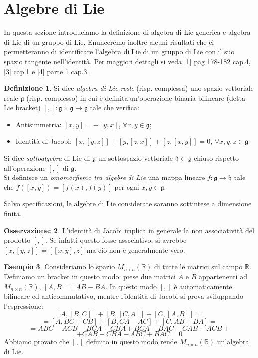 \documentclass[12pt,a4paper]{report}
\theoremstyle{definition}
\newtheorem{Def}{Definizione}[chapter]
\theoremstyle{Theorem}
\theoremstyle{definition}
\newtheorem{Ex}[Def]{Esempio}
\theoremstyle{definition}
\theoremstyle{definition}
\newtheorem{Obs}[Def]{Osservazione:}
\begin{document}
\section{Algebre di Lie}
In questa sezione introduciamo la definizione di algebra di Lie generica e algebra di Lie di un gruppo di Lie. Enunceremo inoltre alcuni risultati che ci permetteranno di identificare l'algebra di Lie di un gruppo di Lie con il suo spazio tangente nell'identità. Per maggiori dettagli si veda [1] pag 178-182 cap.4, [3] cap.1 e [4] parte 1 cap.3.
\begin{Def}
	Si dice \textit{algebra di Lie reale} (risp. complessa) uno spazio vettoriale reale $\mathfrak{g}$ (risp. complesso) in cui è definita un'operazione binaria bilineare (detta Lie bracket) $[,]:\mathfrak{g}\times\mathfrak{g}\rightarrow\mathfrak{g}$ tale che verifica:
	\begin{itemize}
		\item Antisimmetria: $[x,y]=-[y,x]$, $\forall x,y\in\mathfrak{g}$;
		\item Identità di Jacobi: $[x,[y,z]]+[y,[z,x]]+[z,[x,y]]=0$, $\forall x,y,z\in \mathfrak{g}$ 
	\end{itemize}
	Si dice \textit{sottoalgebra} di Lie di $\mathfrak{g}$ un sottospazio vettoriale $\mathfrak{h}\subset\mathfrak{g}$ chiuso rispetto all'operazione $[,]$ di $\mathfrak{g}$.\\
		Si definisce un \textit{omomorfismo tra algebre di Lie} una mappa lineare $f:\mathfrak{g}\rightarrow\mathfrak{h}$ tale che $f([x,y])=[f(x),f(y)]$ per ogni $x,y\in\mathfrak{g}$.
\end{Def}
Salvo specificazioni, le algebre di Lie considerate saranno sottintese a dimensione finita.
\begin{Obs}
	L'identità di Jacobi implica in generale la non associatività del prodotto $[,]$. Se infatti questo fosse associativo, si avrebbe $[x,[y,z]]=[[x,y],z]$ ma ciò non è generalmente vero.
\end{Obs}
\begin{Ex}
	Consideriamo lo spazio $M_{n\times n}(\mathbb{R})$ di tutte le matrici sul campo $\mathbb{R}$. Definiamo un bracket in questo modo: prese due matrici $A$ e $B$ appartenenti ad $M_{n\times n}(\mathbb{R})$, $[A,B]=AB-BA$. In questo modo $[,]$ è automaticamente bilineare ed anticommutativo, mentre l'identità di Jacobi si prova sviluppando l'espressione:
	$$[A,[B,C]]+[B,[C,A]]+[C,[A,B]]=$$
	$$=[A,BC-CB]+[B,CA-AC]+[C,AB-BA]=$$
	$$=ABC-ACB-BCA+CBA+BCA-BAC-CAB+ACB+$$
	$$+CAB-CBA-ABC+BAC=0$$
	Abbiamo provato che $[,]$ definito in questo modo rende $M_{n\times n}(\mathbb{R})$ un'algebra di Lie.
\end{Ex}
\end{document}
